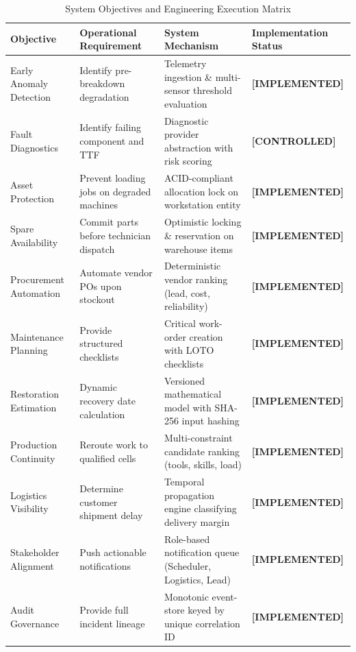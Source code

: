 \documentclass[10pt,twocolumn,a4paper]{article}
\newcommand{\claimtag}[1]{%
    \textsf{\textbf{\scriptsize\color{deepslate}[#1]}}%
}
\begin{document}
\begin{table}[t]
\centering
\scriptsize
\caption{System Objectives and Engineering Execution Matrix\label{tab:system_objectives}}
\begin{tabularx}{\textwidth}{lXXl}
\toprule
\textbf{Objective} & \textbf{Operational Requirement} & \textbf{System Mechanism} & \textbf{Implementation Status} \\
\midrule
Early Anomaly Detection & Identify pre-breakdown degradation & Telemetry ingestion \& multi-sensor threshold evaluation & \claimtag{IMPLEMENTED} \\
Fault Diagnostics & Identify failing component and TTF & Diagnostic provider abstraction with risk scoring & \claimtag{CONTROLLED} \\
Asset Protection & Prevent loading jobs on degraded machines & ACID-compliant allocation lock on workstation entity & \claimtag{IMPLEMENTED} \\
Spare Availability & Commit parts before technician dispatch & Optimistic locking \& reservation on warehouse items & \claimtag{IMPLEMENTED} \\
Procurement Automation & Automate vendor POs upon stockout & Deterministic vendor ranking (lead, cost, reliability) & \claimtag{IMPLEMENTED} \\
Maintenance Planning & Provide structured checklists & Critical work-order creation with LOTO checklists & \claimtag{IMPLEMENTED} \\
Restoration Estimation & Dynamic recovery date calculation & Versioned mathematical model with SHA-256 input hashing & \claimtag{IMPLEMENTED} \\
Production Continuity & Reroute work to qualified cells & Multi-constraint candidate ranking (tools, skills, load) & \claimtag{IMPLEMENTED} \\
Logistics Visibility & Determine customer shipment delay & Temporal propagation engine classifying delivery margin & \claimtag{IMPLEMENTED} \\
Stakeholder Alignment & Push actionable notifications & Role-based notification queue (Scheduler, Logistics, Lead) & \claimtag{IMPLEMENTED} \\
Audit Governance & Provide full incident lineage & Monotonic event-store keyed by unique correlation ID & \claimtag{IMPLEMENTED} \\
\bottomrule
\end{tabularx}
\end{table}

\end{document}
